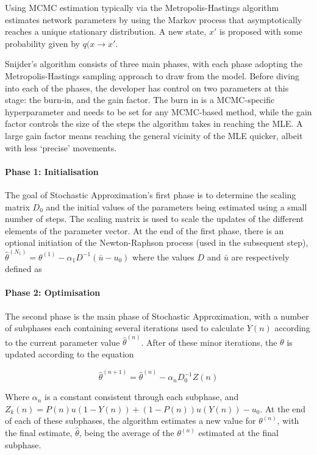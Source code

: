 Using MCMC estimation typically via the Metropolis-Hastings algorithm estimates network parameters by using the Markov process that asymptotically reaches a unique stationary distribution. A new state, $x'$ is proposed with some probability given by $q(x \rightarrow x'$. 


Snijder's algorithm consists of three main phases, with each phase adopting the Metropolis-Hastings sampling approach to draw from the model. Before diving into each of the phases, the developer has control on two parameters at this stage: the burn-in, and the gain factor. The burn in is a MCMC-specific hyperparameter and needs to be set for any MCMC-based method, while the gain factor controls the size of the steps the algorithm takes in reaching the MLE. A large gain factor means reaching the general vicinity of the MLE quicker, albeit with less `precise' movements. 

\paragraph{Phase 1: Initialisation}

The goal of Stochastic Approximation's first phase is to determine the scaling matrix $D_0$ and the initial values of the parameters being estimated using a small number of steps. The scaling matrix is used to scale the updates of the different elements of the parameter vector. At the end of the first phase, there is an optional initiation of the Newton-Raphson process (used in the subsequent step), $\hat{\theta}^{(N_1)} = \theta^{(1)} - \alpha_1 D^{-1}(\bar{u} - u_0)$ where the values $D$ and $\bar{u}$ are respectively defined as

\paragraph{Phase 2: Optimisation}

The second phase is the main phase of Stochastic Approximation, with a number of subphases each containing several iterations used to calculate $Y(n)$ according to the current parameter value $\hat{\theta}^{(n)}$. After of these minor iterations, the $\theta$ is updated according to the equation

\begin{equation}
\hat{\theta}^{(n+1)} = \hat{\theta}^{(n)} - \alpha_nD_0^{-1}Z(n)
\end{equation}

Where $\alpha_n$ is a constant consistent through each subphase, and $Z_k(n) = P(n)u(1-Y(n)) + (1 - P(n))u(Y(n)) - u_0$. At the end of each of these subphases, the algorithm estimates a new value for $\theta^{(n)}$, with the final estimate, $\hat{\theta}$, being the average of the $\theta^{(n)}$ estimated at the final subphase. 

